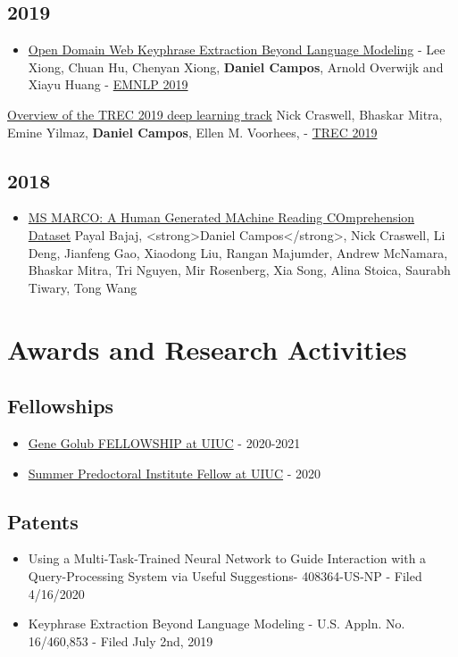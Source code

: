\documentclass[line,margin]{res}
\begin{document}
\begin{resume}
\subsection{2019}
    \begin{itemize}
    \itemsep -5pt
    \item \href{https://arxiv.org/abs/1911.02671}{Open Domain Web Keyphrase Extraction Beyond Language Modeling} - Lee Xiong, Chuan Hu, Chenyan Xiong, \textbf{Daniel Campos}, Arnold Overwijk and Xiayu Huang - \href{https://www.emnlp-ijcnlp2019.org/}{EMNLP 2019}
    \end{itemize}
    \item \href{https://arxiv.org/abs/2003.07820}{Overview of the TREC 2019 deep learning track} Nick Craswell, Bhaskar Mitra, Emine Yilmaz, \textbf{Daniel Campos}, Ellen M. Voorhees, - \href{https://trec.nist.gov/tracks.html}{TREC 2019}
\subsection{2018}
    \begin{itemize}
    \item \href{https://arxiv.org/abs/1611.09268}{MS MARCO: A Human Generated MAchine Reading COmprehension Dataset} Payal Bajaj, <strong>Daniel Campos</strong>, Nick Craswell, Li Deng, Jianfeng Gao, Xiaodong Liu, Rangan Majumder, Andrew McNamara, Bhaskar Mitra, Tri Nguyen, Mir Rosenberg, Xia Song, Alina Stoica, Saurabh Tiwary, Tong Wang 
    \end{itemize}
\section{Awards and Research Activities}
\subsection{Fellowships}
\begin{itemize}
\itemsep -5pt
    \item \href{https://cs.illinois.edu/about/awards/graduate-fellowships-awards/computer-science-gene-golub-fellowship}{Gene Golub FELLOWSHIP at UIUC} - 2020-2021
    \item \href{https://grad.illinois.edu/diversity/spi}{Summer Predoctoral Institute Fellow at UIUC} - 2020
\end{itemize}
\subsection{Patents}
\begin{itemize}
\itemsep -5pt
    \item Using a Multi-Task-Trained Neural Network to Guide Interaction with a Query-Processing System via Useful Suggestions- 408364-US-NP - Filed 4/16/2020
    \item Keyphrase Extraction Beyond Language Modeling - U.S. Appln. No. 16/460,853 - Filed July 2nd, 2019
\end{itemize}

\end{resume}
\end{document}
